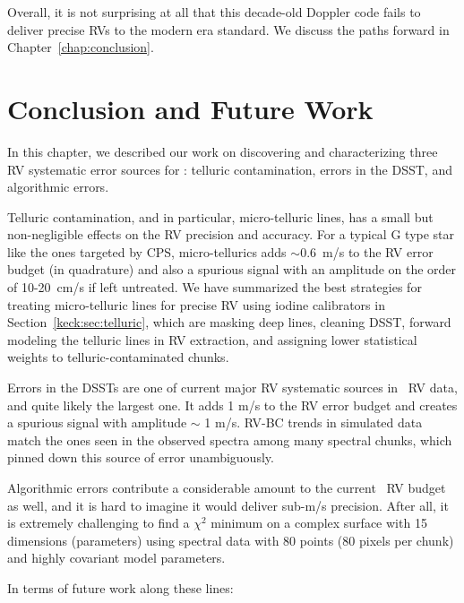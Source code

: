 Overall, it is not surprising at all that this decade-old Doppler code
fails to deliver precise RVs to the modern era standard. We discuss
the paths forward in Chapter~\ref{chap:conclusion}.



\section{Conclusion and Future Work}\label{keck:sec:conclusion}

In this chapter, we described our work on discovering and
characterizing three RV systematic error sources for \keck: telluric
contamination, errors in the DSST, and algorithmic errors. 

Telluric contamination, and in particular, micro-telluric lines, has a
small but non-negligible effects on the RV precision and accuracy. For
a typical G type star like the ones targeted by CPS, micro-tellurics
adds $\sim 0.6$~m/s to the RV error budget (in quadrature) and also a
spurious signal with an amplitude on the order of 10-20~cm/s if left
untreated. We have summarized the best strategies for treating
micro-telluric lines for precise RV using iodine calibrators in
Section~\ref{keck:sec:telluric}, which are masking deep lines,
cleaning DSST, forward modeling the telluric lines in RV extraction,
and assigning lower statistical weights to telluric-contaminated
chunks.

Errors in the DSSTs are one of current major RV systematic sources in
\keck\ RV data, and quite likely the largest one. It adds 1 m/s to the
RV error budget and creates a spurious signal with amplitude $\sim$ 1
m/s. RV-BC trends in simulated data match the ones seen in the
observed spectra among many spectral chunks, which pinned down this
source of error unambiguously. 

Algorithmic errors contribute a considerable amount to the current
\keck\ RV budget as well, and it is hard to imagine it would deliver
sub-m/s precision. After all, it is extremely challenging to find a
$\chi^2$ minimum on a complex surface with 15 dimensions (parameters)
using spectral data with 80 points (80 pixels per chunk) and
highly covariant model parameters. 

In terms of future work along these lines:

